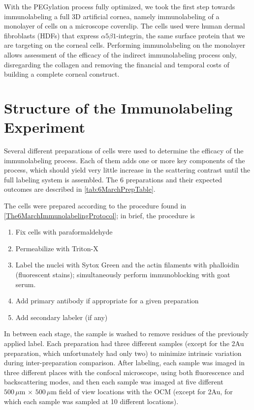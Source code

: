 With the PEGylation process fully optimized, we took the first step towards immunolabeling a full 3D artificial cornea, namely immunolabeling of a monolayer of cells on a microscope coverslip. The cells used were human dermal fibroblasts (HDFs) that express $\alpha5\beta1$-integrin, the same surface protein that we are targeting on the corneal cells. Performing immunolabeling on the monolayer allows assessment of the efficacy of the indirect immunolabeling process only, disregarding the collagen and removing the financial and temporal costs of building a complete corneal construct.

\section{Structure of the Immunolabeling Experiment}
\label{structureoftheimmunolabelingexperiment}

Several different preparations of cells were used to determine the efficacy of the immunolabeling process. Each of them adds one or more key components of the process, which should yield very little increase in the scattering contrast until the full labeling system is assembled. The 6 preparations and their expected outcomes are described in \autoref{tab:6MarchPrepTable}.

The cells were prepared according to the procedure found in \autoref{The6MarchImmunolabelingProtocol}; in brief, the procedure is

\begin{enumerate}
\item Fix cells with paraformaldehyde

\item Permeabilize with Triton-X

\item Label the nuclei with Sytox Green and the actin filaments with phalloidin (fluorescent stains); simultaneously perform immunoblocking with goat serum.

\item Add primary antibody if appropriate for a given preparation

\item Add secondary labeler (if any)

\end{enumerate}

In between each stage, the sample is washed to remove residues of the previously applied label. Each preparation had three different samples (except for the 2Au preparation, which unfortunately had only two) to minimize intrinsic variation during inter-preparation comparison. After labeling, each sample was imaged in three different places with the confocal microscope, using both fluorescence and backscattering modes, and then each sample was imaged at five different $500\,\mu\mathrm{m}\,\times\,500\,\mu\mathrm{m}$ field of view locations with the OCM (except for 2Au, for which each sample was sampled at 10 different locations).


